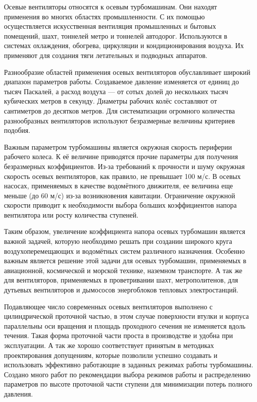 
{\actuality} 
Осевые вентиляторы относятся к осевым турбомашинам. Они находят применения во многих областях промышленности. С их помощью осуществляется искусственная вентиляция промышленных и бытовых помещений, шахт, тоннелей метро и тоннелей автодорог. Используются в системах охлаждения, обогрева, циркуляции и кондиционирования воздуха. Их применяют для создания тяги летательных и подводных аппаратов.

Разнообразие областей применения осевых вентиляторов обуславливает широкий диапазон параметров работы. Создаваемое давление изменяется от единиц до тысяч Паскалей, а расход воздуха --- от сотых долей до нескольких тысяч кубических метров в секунду. Диаметры рабочих колёс составляют от сантиметров до десятков метров. Для систематизации огромного количества разнообразных вентиляторов используют безразмерные величины критериев подобия.

Важным параметром турбомашины является окружная скорость периферии рабочего колеса. К её величине приводятся прочие параметры для получения безразмерных коэффициентов. Из-за требований к прочности и шуму окружная скорость осевых вентиляторов, как правило, не превышает 100 м/с. В осевых насосах, применяемых в качестве водомётного движителя, ее величина еще меньше (до 60 м/с) из-за возникновения кавитации. Ограничение окружной скорости приводит к необходимости выбора больших коэффициентов напора вентилятора или росту количества ступеней.  

Таким образом, увеличение коэффициента напора осевых турбомашин является важной задачей, которую необходимо решать при создании широкого круга воздухоперемещающих и водомётных систем различного назначения. Особенно важным является решение этой задачи для осевых турбомашин, применяемых в авиационной, космической и морской технике, наземном транспорте. А так же для вентиляторов, применяемых в проветривании шахт, метрополитенов, для дутьевых вентиляторов и дымососов энергоблоков тепловых электростанций. 

Подавляющее число современных осевых вентиляторов выполнено с цилиндрической проточной частью, в этом случае поверхности втулки и корпуса параллельны оси вращения и площадь проходного сечения не изменяется вдоль течения. Такая форма проточной части проста в производстве и удобна при эксплуатации. А так же хорошо соответствует принятым в методиках проектирования допущениям, которые позволили успешно создавать и использовать эффективно работающие в заданных режимах работы турбомашины. Создано много работ по рекомендации выбора режимов работы и распределению параметров по высоте проточной части ступени для минимизации потерь полного давления.

